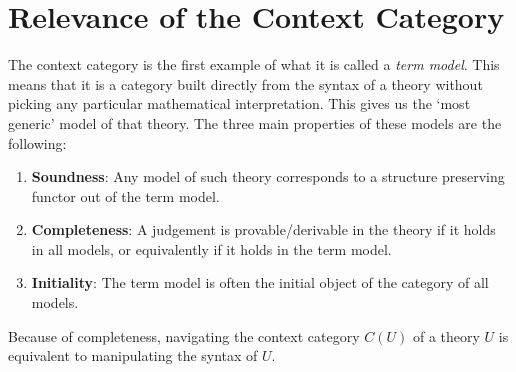 \newpage

\section{Relevance of the Context Category} \label{sect:relevance-of-the-context-category}

The context category is the first example of what it is called a \textit{term model}.
This means that it is a category built directly from the syntax of a theory 
without picking any particular mathematical interpretation. 
This gives us the `most generic' model of that theory.
The three main properties of these models are the following:
\begin{enumerate}
    \item \textbf{Soundness}: Any model of such theory corresponds to a structure preserving 
          functor out of the term model.
    \item \textbf{Completeness}: A judgement is provable/derivable in the theory if it holds in all models, 
          or equivalently if it holds in the term model.
    \item \textbf{Initiality}: The term model is often the initial object of the category of all models.
\end{enumerate}
Because of completeness, navigating the context category $C(U)$ of a theory $U$ is equivalent to manipulating the syntax of $U$.

